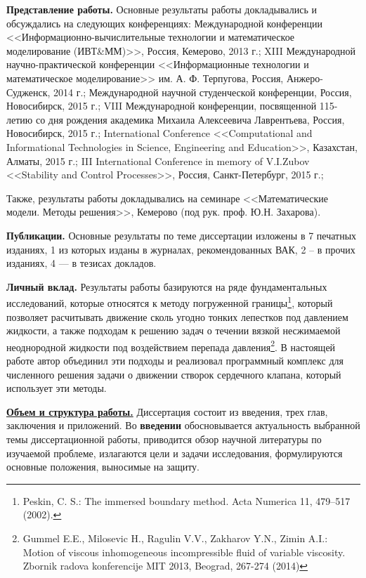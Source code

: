 \textbf{Представление работы.}
Основные результаты работы докладывались и обсуждались на следующих
конференциях: Международной конференции <<Информационно-вычислительные
технологии и математическое моделирование (ИВТ\&ММ)>>, Россия, Кемерово, 2013
г.; XIII Международной научно-практической конференции <<Информационные
технологии и математическое моделирование>> им. А. Ф. Терпугова, Россия,
Анжеро-Судженск, 2014 г.; Международной научной студенческой конференции,
Россия, Новосибирск, 2015 г.; VIII Международной конференции, посвященной
115-летию со дня рождения академика Михаила Алексеевича Лаврентьева, Россия,
Новосибирск, 2015 г.; International Conference <<Computational and
Informational Technologies in Science, Engineering and Education>>, Казахстан,
Алматы, 2015 г.; III International Conference in memory of V.I.Zubov
<<Stability and Control Processes>>, Россия, Санкт-Петербург, 2015 г.;

Также, результаты работы докладывались на семинаре <<Математические модели.
Методы решения>>, Кемерово (под рук. проф. Ю.Н. Захарова). 

\textbf{Публикации.} Основные результаты по теме диссертации изложены в 7
печатных изданиях, 1 из которых изданы в журналах, рекомендованных ВАК, 2 -- в
прочих изданиях, 4 --- в тезисах докладов.

\textbf{Личный вклад.} Результаты работы базируются на ряде фундаментальных
исследований, которые относятся к методу погруженной границы\footnote{ Peskin,
    C. S.: The immersed boundary method. Acta Numerica 11, 479–517 (2002).  },
который позволяет расчитывать движение сколь угодно тонких лепестков под
давлением жидкости, а также подходам к решению задач о течении вязкой
несжимаемой неоднородной жидкости под воздействием перепада давления\footnote{
    Gummel E.E., Milosevic H., Ragulin V.V., Zakharov Y.N., Zimin A.I.: Motion
    of viscous inhomogeneous incompressible fluid of variable viscosity.
    Zbornik radova konferencije MIT 2013, Beograd, 267-274 (2014) }. В
настоящей работе автор объединил эти подходы и реализовал программный комплекс
для численного решения задачи о движении створок сердечного клапана, который
использует эти методы.

\underline{\textbf{Объем и структура работы.}}
Диссертация состоит из введения, трех глав, заключения и приложений. Во
\textbf{введении} обосновывается актуальность выбранной темы диссертационной
работы, приводится обзор научной литературы по изучаемой проблеме, излагаются
цели и задачи исследования, формулируются основные положения, выносимые на
защиту.

